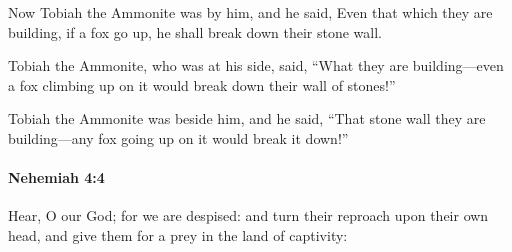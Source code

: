 			\begin{versebox}
					\item[BHS] 
					\item[LXX] 
					\item[ASV] Now Tobiah the Ammonite was by him, and he said, Even that which they are building, if a fox go up, he shall break down their stone wall.
					\item[NIV] Tobiah the Ammonite, who was at his side, said, “What they are building—even a fox climbing up on it would break down their wall of stones!”
					\item[NRSV] Tobiah the Ammonite was beside him, and he said, “That stone wall they are building—any fox going up on it would break it down!”
			\end{versebox}

		\paragraph{Nehemiah 4:4} %
			\label{NEHEMIAH-4-4}

			Hear, O our God; for we are despised: and turn their reproach upon their own head, and give them for a prey in the land of captivity:

